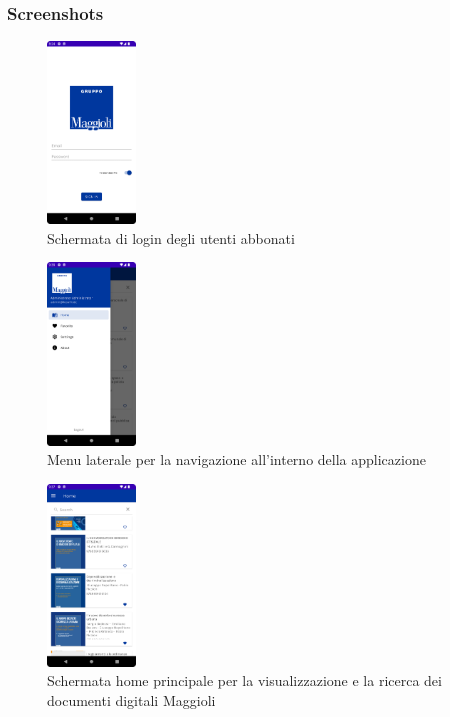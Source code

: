 \subsubsection{Screenshots}

\begin{multicols}{3}
            \begin{figure}[H]
                \includegraphics[width=0.21\textwidth]{img/login.png}
                \caption{Schermata di login degli utenti abbonati}
                \label{login}
            \end{figure}

            \begin{figure}[H]
                \includegraphics[width=0.21\textwidth]{img/sidenav.png}
                \caption{Menu laterale per la navigazione all'interno della applicazione}
                \label{sidenav}
            \end{figure}
            
            \begin{figure}[H]
                \includegraphics[width=0.21\textwidth]{img/home.png}
                \caption{Schermata home principale per la visualizzazione e la ricerca dei documenti digitali Maggioli}
                \label{home}
            \end{figure}
            

\end{multicols}
